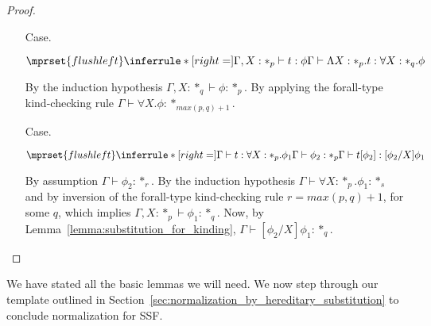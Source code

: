 \begin{proof}
\begin{itemize}
\item[Case.] \ \\
  \begin{center}
    \begin{math}
      $$\mprset{flushleft}
      \inferrule* [right=] {
        \Gamma, X : *_p \vdash t : \phi
      }{\Gamma \vdash \Lambda X:*_p.t:\forall X : *_q.\phi}
    \end{math}
  \end{center}
  By the induction hypothesis $\Gamma,X:*_q \vdash \phi:*_p$.  By applying
  the forall-type kind-checking rule $\Gamma \vdash \forall X.\phi:*_{max(p,q)+1}$.
  
\item[Case.] \ \\
  \begin{center}
    \begin{math}
      $$\mprset{flushleft}
      \inferrule* [right=] {
        \Gamma \vdash t:\forall X:*_p.\phi_1
        \\
        \Gamma \vdash \phi_2:*_p
      }{\Gamma \vdash t[\phi_2]: [\phi_2/X]\phi_1}
    \end{math}
  \end{center}
  By assumption $\Gamma \vdash \phi_2:*_r$.  By the induction hypothesis 
  $\Gamma \vdash \forall X:*_p.\phi_1:*_s$ and by inversion of the forall-type
  kind-checking rule $r = max(p,q)+1$, for some $q$, which implies 
  $\Gamma,X:*_p \vdash \phi_1:*_q$.  Now, by Lemma~\ref{lemma:substitution_for_kinding},
  $\Gamma \vdash [\phi_2/X]\phi_1:*_q$.
\end{itemize}
\end{proof}
\noindent
We have stated all the basic lemmas we will need.  We now step through
our template outlined in
Section~\ref{sec:normalization_by_hereditary_substitution} to conclude
normalization for SSF.

